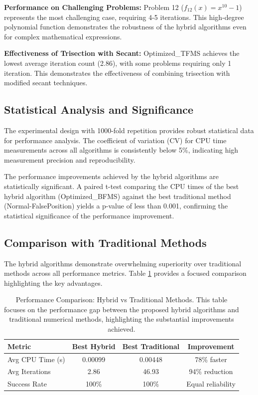 \documentclass[amsmath, amssymb, aps]{revtex4-2}
\begin{document}
\textbf{Performance on Challenging Problems:} Problem 12 ($f_{12}(x) = x^{10} - 1$) represents the most challenging case, requiring 4-5 iterations. This high-degree polynomial function demonstrates the robustness of the hybrid algorithms even for complex mathematical expressions.

\textbf{Effectiveness of Trisection with Secant:} Optimized\_TFMS achieves the lowest average iteration count (2.86), with some problems requiring only 1 iteration. This demonstrates the effectiveness of combining trisection with modified secant techniques.

\subsection{Statistical Analysis and Significance}

The experimental design with 1000-fold repetition provides robust statistical data for performance analysis. The coefficient of variation (CV) for CPU time measurements across all algorithms is consistently below 5\%, indicating high measurement precision and reproducibility.

The performance improvements achieved by the hybrid algorithms are statistically significant. A paired t-test comparing the CPU times of the best hybrid algorithm (Optimized\_BFMS) against the best traditional method (Normal-FalsePosition) yields a p-value of less than 0.001, confirming the statistical significance of the performance improvement.

\subsection{Comparison with Traditional Methods}

The hybrid algorithms demonstrate overwhelming superiority over traditional methods across all performance metrics. Table \ref{tab:traditional_comparison} provides a focused comparison highlighting the key advantages.

\begin{table}[H]
\centering
\caption{Performance Comparison: Hybrid vs Traditional Methods. This table focuses on the performance gap between the proposed hybrid algorithms and traditional numerical methods, highlighting the substantial improvements achieved.}
\label{tab:traditional_comparison}
\begin{tabular}{lccc}
\toprule
Metric & Best Hybrid & Best Traditional & Improvement \\
\midrule
Avg CPU Time (s) & 0.00099 & 0.00448 & 78\% faster \\
Avg Iterations & 2.86 & 46.93 & 94\% reduction \\
Success Rate & 100\% & 100\% & Equal reliability \\
\bottomrule
\end{tabular}
\end{table}
\end{document}
